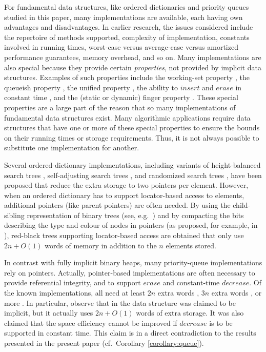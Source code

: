 \documentclass{DIKU-article}
\newcommand{\Erase}{\mbox{$\mathit{erase}$}}
\newcommand{\Insert}{\mbox{$\mathit{insert}$}}
\newcommand{\Decrease}{\mbox{$\mathit{decrease}$}}
\begin{document}
For fundamental data structures, like ordered dictionaries and
priority queues studied in this paper, many implementations
are available, each having own advantages and disadvantages.  In
earlier research, the issues considered include the repertoire of
methods supported, complexity of implementation, constants involved
in running times, worst-case versus average-case versus amortized
performance guarantees, memory overhead, and so on.  Many
implementations are also special because they provide certain
\emph{properties}, not provided by implicit data structures.  Examples
of such properties include the working-set property \cite{i01,st85b},
the queueish property \cite{il02}, the unified property
\cite{i01,st85b}, the ability to \Insert{} and \Erase{} in constant
time \cite{Fle96,hm82,LO88}, and the (static or dynamic) finger
property \cite{as96,bt80,c95,gmpr77,hm82}.  These special properties
are a large part of the reason that so many implementations of
fundamental data structures exist.  Many algorithmic applications require
data structures that have one or more of these special properties to ensure the
bounds on their running times or storage requirements.  Thus, it is
not always possible to substitute one implementation for another.

Several ordered-dictionary implementations, including variants of
height-balanced search trees \cite{Bro79}, self-adjusting search trees
\cite{And99,gr93,st85b}, and randomized search trees \cite{as96,p90},
have been proposed that reduce the extra storage to two pointers per
element. However, when an ordered dictionary has to support
locator-based access to elements, additional pointers (like parent
pointers) are often needed. By using the child-sibling representation
of binary trees (see, e.g.~\cite[Section 4.1]{Tar83}) and by
compacting the bits describing the type and colour of nodes in pointers (as proposed, for example, in
\cite{BK06}), red-black trees supporting locator-based access are
obtained that only use $2n + O(1)$ words of memory in addition to the
$n$ elements stored.

In contrast with fully implicit binary heaps, 
many priority-queue implementations rely on
pointers. Actually, pointer-based implementations are often necessary
to provide referential integrity, and to support \Erase{} and
constant-time \Decrease{}. Of the known implementations, all need at
least $2n$ extra words \cite{DW93,MP05}, $3n$ extra words
\cite{EJK05}, or more \cite{DGST88,KST02}. In particular, observe that
in \cite{MP05} the data structure was claimed to be implicit, but it
actually uses $2n + O(1)$ words of extra storage. It was also claimed
that the space efficiency cannot be improved if \Decrease{} is to be
supported in constant time. This claim is in a direct contradiction to
the results presented in the present paper (cf.~Corollary
\ref{corollary:queue}).
\end{document}
